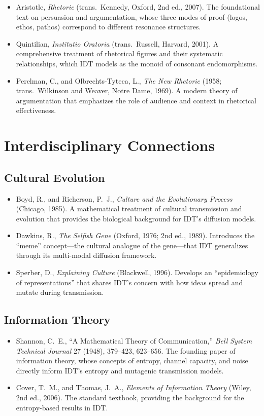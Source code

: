 \documentclass[11pt,openany]{book}
\theoremstyle{definition}
\theoremstyle{plain}
\theoremstyle{remark}
\begin{document}
\begin{itemize}
\item Aristotle, \textit{Rhetoric} (trans.~Kennedy, Oxford, 2nd ed., 2007). The foundational text on persuasion and argumentation, whose three modes of proof (logos, ethos, pathos) correspond to different resonance structures.
\item Quintilian, \textit{Institutio Oratoria} (trans.~Russell, Harvard, 2001). A comprehensive treatment of rhetorical figures and their systematic relationships, which IDT models as the monoid of consonant endomorphisms.
\item Perelman, C., and Olbrechts-Tyteca, L., \textit{The New Rhetoric} (1958; trans.~Wilkinson and Weaver, Notre Dame, 1969). A modern theory of argumentation that emphasizes the role of audience and context in rhetorical effectiveness.
\end{itemize}

\section{Interdisciplinary Connections}

\subsection{Cultural Evolution}

\begin{itemize}
\item Boyd, R., and Richerson, P.~J., \textit{Culture and the Evolutionary Process} (Chicago, 1985). A mathematical treatment of cultural transmission and evolution that provides the biological background for IDT's diffusion models.
\item Dawkins, R., \textit{The Selfish Gene} (Oxford, 1976; 2nd ed., 1989). Introduces the ``meme'' concept---the cultural analogue of the gene---that IDT generalizes through its multi-modal diffusion framework.
\item Sperber, D., \textit{Explaining Culture} (Blackwell, 1996). Develops an ``epidemiology of representations'' that shares IDT's concern with how ideas spread and mutate during transmission.
\end{itemize}

\subsection{Information Theory}

\begin{itemize}
\item Shannon, C.~E., ``A Mathematical Theory of Communication,'' \textit{Bell System Technical Journal} 27 (1948), 379--423, 623--656. The founding paper of information theory, whose concepts of entropy, channel capacity, and noise directly inform IDT's entropy and mutagenic transmission models.
\item Cover, T.~M., and Thomas, J.~A., \textit{Elements of Information Theory} (Wiley, 2nd ed., 2006). The standard textbook, providing the background for the entropy-based results in IDT.
\end{itemize}
\end{document}
